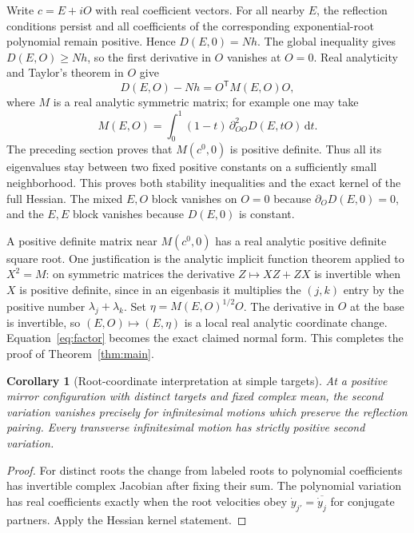 \documentclass[11pt]{article}
\newtheorem{corollary}[theorem]{Corollary}
\theoremstyle{remark}\newtheorem{remark}[theorem]{Remark}
\newcommand{\dd}{\,\mathrm d}\newcommand{\supp}{\operatorname{supp}}
\begin{document}
Write $c=E+iO$ with real coefficient vectors. For all nearby $E$, the
reflection conditions persist and all coefficients of the corresponding
exponential-root polynomial remain positive. Hence $D(E,0)=Nh$.
The global inequality gives $D(E,O)\ge Nh$, so the first derivative in
$O$ vanishes at $O=0$. Real analyticity and Taylor's theorem in $O$ give
\begin{equation}\label{eq:factor}
 D(E,O)-Nh=O^{\mathsf T}M(E,O)O,
\end{equation}
where $M$ is a real analytic symmetric matrix; for example one may take
\[
 M(E,O)=\int_0^1(1-t)\,\partial_{OO}^2D(E,tO)\dd t.
\]
The preceding section proves that $M(c^0,0)$ is positive definite. Thus
all its eigenvalues stay between two fixed positive constants on a
sufficiently small neighborhood. This proves both stability inequalities
and the exact kernel of the full Hessian. The mixed $E,O$ block vanishes
on $O=0$ because $\partial_OD(E,0)=0$, and the $E,E$ block vanishes
because $D(E,0)$ is constant.

A positive definite matrix near $M(c^0,0)$ has a real analytic positive
definite square root. One justification is the analytic implicit function
theorem applied to $X^2=M$: on symmetric matrices the derivative
$Z\mapsto XZ+ZX$ is invertible when $X$ is positive definite, since in
an eigenbasis it multiplies the $(j,k)$ entry by the positive number
$\lambda_j+\lambda_k$. Set
$\eta=M(E,O)^{1/2}O$. The derivative in $O$ at the base is invertible,
so $(E,O)\mapsto(E,\eta)$ is a local real analytic coordinate change.
Equation~\eqref{eq:factor} becomes the exact claimed normal form.
This completes the proof of Theorem~\ref{thm:main}.

\begin{corollary}[Root-coordinate interpretation at simple targets]
At a positive mirror configuration with distinct targets and fixed complex
mean, the second variation vanishes precisely for infinitesimal motions
which preserve the reflection pairing. Every transverse infinitesimal
motion has strictly positive second variation.
\end{corollary}

\begin{proof}
For distinct roots the change from labeled roots to polynomial coefficients
has invertible complex Jacobian after fixing their sum. The polynomial
variation has real coefficients exactly when the root velocities obey
$\dot y_{j'}=\overline{\dot y_j}$ for conjugate partners. Apply the
Hessian kernel statement.
\end{proof}
\end{document}

